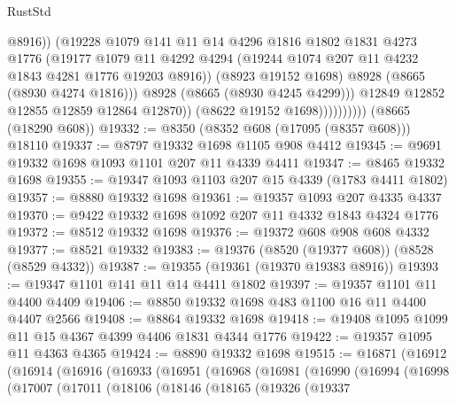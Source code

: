 \begin{lexlean}{RustStd}
\begin{coremodule}
                                @8916))
                            (@19228
                              @1079
                              @141
                              @11
                              @14
                              @4296
                              @1816
                              @1802
                              @1831
                              @4273
                              @1776
                              (@19177
                                @1079
                                @11
                                @4292
                                @4294
                                (@19244 @1074 @207 @11 @4232 @1843 @4281 @1776 @19203 @8916))
                              (@8923 @19152 @1698)
                              @8928
                              (@8665 (@8930 @4274 @1816)))
                            @8928
                            (@8665 (@8930 @4245 @4299)))
                          @12849
                          @12852
                          @12855
                          @12859
                          @12864
                          @12870))
                      (@8622 @19152 @1698))))))))))
    (@8665 (@18290 @608))
@19332 := @8350 (@8352 @608 (@17095 (@8357 @608))) @18110
@19337 := @8797 @19332 @1698 @1105 @908 @4412
@19345 := @9691 @19332 @1698 @1093 @1101 @207 @11 @4339 @4411
@19347 := @8465 @19332 @1698
@19355 := @19347 @1093 @1103 @207 @15 @4339 (@1783 @4411 @1802)
@19357 := @8880 @19332 @1698
@19361 := @19357 @1093 @207 @4335 @4337
@19370 := @9422 @19332 @1698 @1092 @207 @11 @4332 @1843 @4324 @1776
@19372 := @8512 @19332 @1698
@19376 := @19372 @608 @908 @608 @4332
@19377 := @8521 @19332
@19383 := @19376 (@8520 (@19377 @608)) (@8528 (@8529 @4332))
@19387 := @19355 (@19361 (@19370 @19383 @8916))
@19393 := @19347 @1101 @141 @11 @14 @4411 @1802
@19397 := @19357 @1101 @11 @4400 @4409
@19406 := @8850 @19332 @1698 @483 @1100 @16 @11 @4400 @4407 @2566
@19408 := @8864 @19332 @1698
@19418 := @19408 @1095 @1099 @11 @15 @4367 @4399 @4406 @1831 @4344 @1776
@19422 := @19357 @1095 @11 @4363 @4365
@19424 := @8890 @19332 @1698
@19515 := @16871
    (@16912
      (@16914
        (@16916
          (@16933
            (@16951
              (@16968
                (@16981
                  (@16990
                    (@16994
                      (@16998
                        (@17007
                          (@17011
                            (@18106
                              (@18146
                                (@18165
                                  (@19326
                                    (@19337

\end{coremodule}
\end{lexlean}
